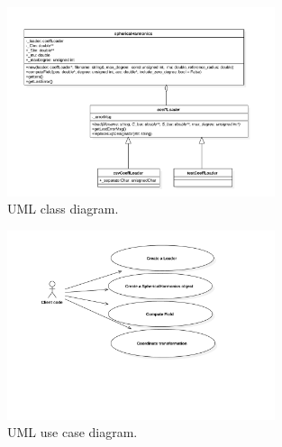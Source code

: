 \documentclass[]{AVSSimReportMemo}
\begin{document}
\begin{figure}
\centering
\includegraphics[width=0.7\textwidth]{Figures/class_diagram.pdf}
\caption{UML class diagram.}\label{fig:class}
\end{figure}

\begin{figure}[h]
\centering
\includegraphics[width=0.7\textwidth]{Figures/usecase_diagram.pdf}
\caption{UML use case diagram.}\label{fig:use_case}
\end{figure}

{}

\end{document}
